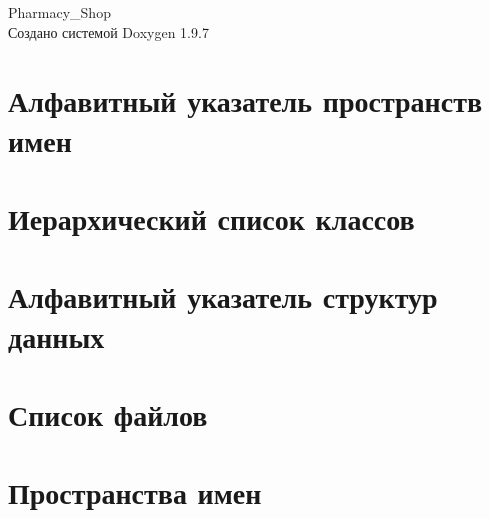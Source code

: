 \documentclass[twoside]{book}
\newcommand{\+}{\discretionary{\mbox{\scriptsize$\hookleftarrow$}}{}{}}
\newcommand{\clearemptydoublepage}{%
    \newpage{\pagestyle{empty}\cleardoublepage}%
  }
\begin{document}
  \raggedbottom
    \hypersetup{pageanchor=false,
                bookmarksnumbered=true,
                pdfencoding=unicode
               }
  \begin{titlepage}
  \vspace*{7cm}
  \begin{center}%
  {\Large Pharmacy\+\_\+\+Shop}\\
  \vspace*{1cm}
  {\large Создано системой Doxygen 1.9.7}\\
  \end{center}
  \end{titlepage}
  \clearemptydoublepage
  \tableofcontents
  \clearemptydoublepage
  \hypersetup{pageanchor=true}
\chapter{Алфавитный указатель пространств имен}

\chapter{Иерархический список классов}

\chapter{Алфавитный указатель структур данных}

\chapter{Список файлов}

\chapter{Пространства имен}











\end{document}
